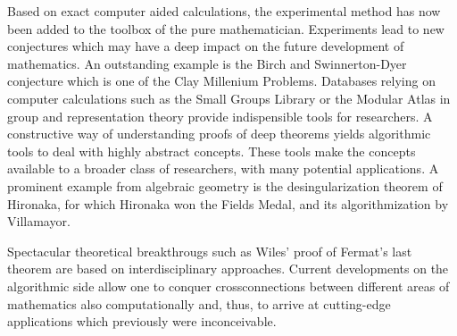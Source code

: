 \documentclass[a4paper,11pt]{article}
\begin{document}
Based on exact computer aided calculations, the experimental method has
now been added to the toolbox of the pure mathematician. Experiments
lead to new conjectures which may have a deep impact on the future
development of mathematics. An outstanding example is the Birch and
Swinnerton-Dyer conjecture which is one of the Clay Millenium Problems.
Databases relying on computer calculations such as the Small Groups
Library or the Modular Atlas in group and representation theory provide
indispensible tools for researchers. A constructive way of understanding
proofs of deep theorems yields algorithmic tools to deal with highly abstract
concepts. These tools make the concepts available to a broader class of
researchers, with many potential applications. A prominent example from
algebraic geometry is the desingularization theorem of Hironaka, for which
Hironaka won the Fields Medal, and its algorithmization by Villamayor.

Spectacular theoretical breakthrougs such as Wiles' proof of Fermat's last
theorem are based on interdisciplinary approaches. Current developments
on the algorithmic side allow one to conquer crossconnections between
different areas of mathematics also computationally and, thus, to
arrive at cutting-edge applications which previously were inconceivable.
\end{document}
